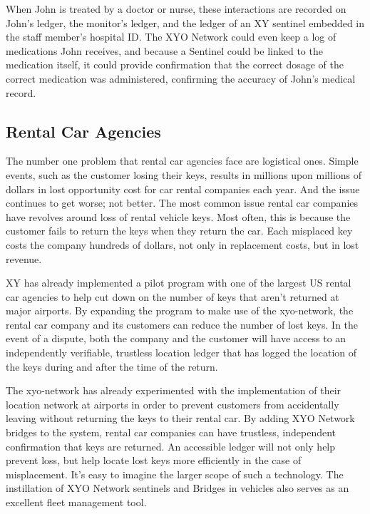 \documentclass{article}
\begin{document}
When John is treated by a doctor or nurse, these interactions are recorded on John's ledger, the monitor's ledger, and the ledger of an XY \Gls{sentinel} embedded in the staff member's hospital ID. The XYO Network could even keep a log of medications John receives, and because a Sentinel could be linked to the medication itself, it could provide confirmation that the correct dosage of the correct medication was administered, confirming the accuracy of John's medical record.

\subsection{Rental Car Agencies}
The number one problem that rental car agencies face are logistical ones. Simple events, such as the customer losing their keys, results in millions upon millions of dollars in lost opportunity cost for car rental companies each year. And the issue continues to get worse; not better. The most common issue rental car companies have revolves around loss of rental vehicle keys. Most often, this is because the customer fails to return the keys when they return the car. Each misplaced key costs the company hundreds of dollars, not only in replacement costs, but in lost revenue.

XY has already implemented a pilot program with one of the largest US rental car agencies to help cut down on the number of keys that aren't returned at major airports. By expanding the program to make use of the \Gls{xyo-network}, the rental car company and its customers can reduce the number of lost keys. In the event of a dispute, both the company and the customer will have access to an independently verifiable, trustless location ledger that has logged the location of the keys during and after the time of the return.

The \Gls{xyo-network} has already experimented with the implementation of their location network at airports in order to prevent customers from accidentally leaving without returning the keys to their rental car. By adding XYO Network \Glspl{bridge} to the system, rental car companies can have trustless, independent confirmation that keys are returned.  An accessible ledger will not only help prevent loss, but help locate lost keys more efficiently in the case of misplacement. It's easy to imagine the larger scope of such a technology. The instillation of XYO Network \Glspl{sentinel} and Bridges in vehicles also serves as an excellent fleet management tool.
\end{document}
